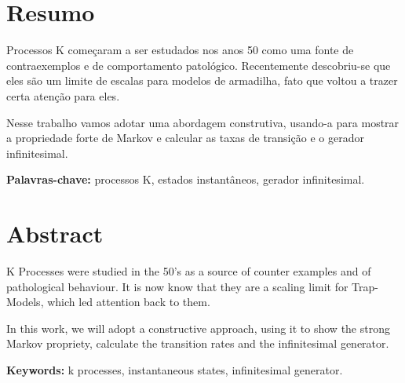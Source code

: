 

\chapter*{Resumo}

Processos K começaram a ser estudados nos anos 50 como uma fonte de
contraexemplos e de comportamento patológico. Recentemente
descobriu-se que eles são um limite de escalas para modelos de
armadilha, fato que voltou a trazer certa atenção para eles.

Nesse trabalho vamos adotar uma abordagem construtiva, usando-a para
mostrar a propriedade forte de Markov e calcular as taxas de transição
e o gerador infinitesimal.

\noindent \textbf{Palavras-chave:} processos K, estados instantâneos,
gerador infinitesimal.

\chapter*{Abstract}

K Processes were studied in the 50's as a source of counter examples
and of pathological behaviour. It is now know that they are a scaling
limit for Trap-Models, which led attention back to them.

In this work, we will adopt a constructive approach, using it to show
the strong Markov propriety, calculate the transition rates and
the infinitesimal generator.

\noindent \textbf{Keywords:} k processes, instantaneous states,
infinitesimal generator.


